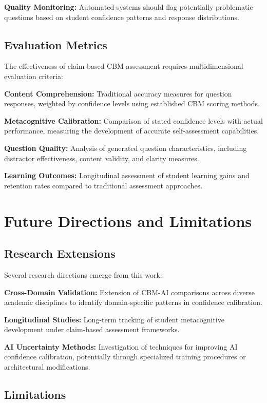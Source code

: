 \documentclass[sigconf]{acmart}
\begin{document}
\textbf{Quality Monitoring:} Automated systems should flag potentially problematic questions based on student confidence patterns and response distributions.

\subsection{Evaluation Metrics}

The effectiveness of claim-based CBM assessment requires multidimensional evaluation criteria:

\textbf{Content Comprehension:} Traditional accuracy measures for question responses, weighted by confidence levels using established CBM scoring methods.

\textbf{Metacognitive Calibration:} Comparison of stated confidence levels with actual performance, measuring the development of accurate self-assessment capabilities.

\textbf{Question Quality:} Analysis of generated question characteristics, including distractor effectiveness, content validity, and clarity measures.

\textbf{Learning Outcomes:} Longitudinal assessment of student learning gains and retention rates compared to traditional assessment approaches.

\section{Future Directions and Limitations}

\subsection{Research Extensions}

Several research directions emerge from this work:

\textbf{Cross-Domain Validation:} Extension of CBM-AI comparisons across diverse academic disciplines to identify domain-specific patterns in confidence calibration.

\textbf{Longitudinal Studies:} Long-term tracking of student metacognitive development under claim-based assessment frameworks.

\textbf{AI Uncertainty Methods:} Investigation of techniques for improving AI confidence calibration, potentially through specialized training procedures or architectural modifications.

\subsection{Limitations}
\end{document}
